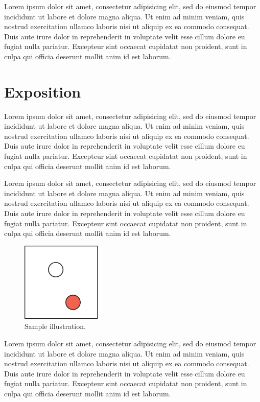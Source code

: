 \documentclass[review]{acmsiggraph}
\begin{document}
Lorem ipsum dolor sit amet, consectetur adipisicing elit, sed do
eiusmod tempor incididunt ut labore et dolore magna aliqua. Ut enim ad
minim veniam, quis nostrud exercitation ullamco laboris nisi ut
aliquip ex ea commodo consequat. Duis aute irure dolor in
reprehenderit in voluptate velit esse cillum dolore eu fugiat nulla
pariatur. Excepteur sint occaecat cupidatat non proident, sunt in
culpa qui officia deserunt mollit anim id est laborum.

\section{Exposition}

Lorem ipsum dolor sit amet, consectetur adipisicing elit, sed do
eiusmod tempor incididunt ut labore et dolore magna aliqua. Ut enim ad
minim veniam, quis nostrud exercitation ullamco laboris nisi ut
aliquip ex ea commodo consequat. Duis aute irure dolor in
reprehenderit in voluptate velit esse cillum dolore eu fugiat nulla
pariatur. Excepteur sint occaecat cupidatat non proident, sunt in
culpa qui officia deserunt mollit anim id est laborum.

Lorem ipsum dolor sit amet, consectetur adipisicing elit, sed do
eiusmod tempor incididunt ut labore et dolore magna aliqua. Ut enim ad
minim veniam, quis nostrud exercitation ullamco laboris nisi ut
aliquip ex ea commodo consequat. Duis aute irure dolor in
reprehenderit in voluptate velit esse cillum dolore eu fugiat nulla
pariatur. Excepteur sint occaecat cupidatat non proident, sunt in
culpa qui officia deserunt mollit anim id est laborum.
\begin{figure}[ht]
  \centering
  \includegraphics[width=1.5in]{images/samplefigure}
  \caption{Sample illustration.}
\end{figure}
Lorem ipsum dolor sit amet, consectetur adipisicing elit, sed do
eiusmod tempor incididunt ut labore et dolore magna aliqua. Ut enim ad
minim veniam, quis nostrud exercitation ullamco laboris nisi ut
aliquip ex ea commodo consequat. Duis aute irure dolor in
reprehenderit in voluptate velit esse cillum dolore eu fugiat nulla
pariatur. Excepteur sint occaecat cupidatat non proident, sunt in
culpa qui officia deserunt mollit anim id est laborum.
\end{document}
